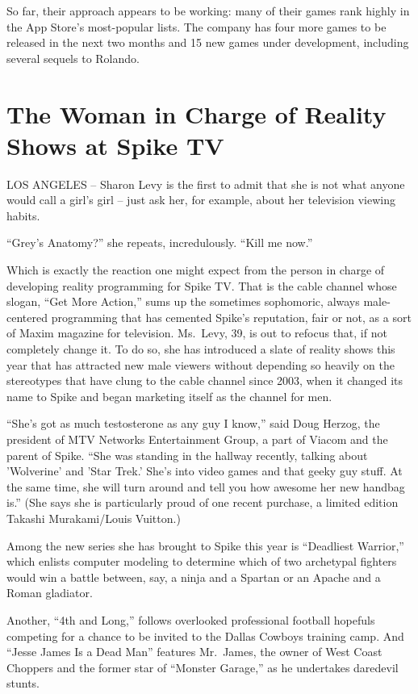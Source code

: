 \documentclass[12pt,a4paper,onecolumn]{article}
\begin{document}
So far, their approach appears to be working: many of their games rank highly in the App Store's
most-popular lists. The company has four more games to be released in the next two months and 15 new
games under development, including several sequels to Rolando.


\section{The Woman in Charge of Reality Shows at Spike TV}

LOS ANGELES -- Sharon Levy is the first to admit that she is not what anyone would call a girl's
girl -- just ask her, for example, about her television viewing habits.

``Grey's Anatomy?'' she repeats, incredulously. ``Kill me now.''

Which is exactly the reaction one might expect from the person in charge of developing reality
programming for Spike TV. That is the cable channel whose slogan, ``Get More Action,'' sums up the
sometimes sophomoric, always male-centered programming that has cemented Spike's reputation, fair or
not, as a sort of Maxim magazine for television. Ms.~Levy, 39, is out to refocus that, if not
completely change it. To do so, she has introduced a slate of reality shows this year that has
attracted new male viewers without depending so heavily on the stereotypes that have clung to the
cable channel since 2003, when it changed its name to Spike and began marketing itself as the
channel for men.

``She's got as much testosterone as any guy I know,'' said Doug Herzog, the president of MTV
Networks Entertainment Group, a part of Viacom and the parent of Spike. ``She was standing in the
hallway recently, talking about 'Wolverine' and 'Star Trek.' She's into video games and that geeky
guy stuff. At the same time, she will turn around and tell you how awesome her new handbag is.''
(She says she is particularly proud of one recent purchase, a limited edition Takashi Murakami/Louis
Vuitton.)

Among the new series she has brought to Spike this year is ``Deadliest Warrior,'' which enlists
computer modeling to determine which of two archetypal fighters would win a battle between, say, a
ninja and a Spartan or an Apache and a Roman gladiator.

Another, ``4th and Long,'' follows overlooked professional football hopefuls competing for a chance
to be invited to the Dallas Cowboys training camp. And ``Jesse James Is a Dead Man'' features
Mr.~James, the owner of West Coast Choppers and the former star of ``Monster Garage,'' as he
undertakes daredevil stunts.
\end{document}
